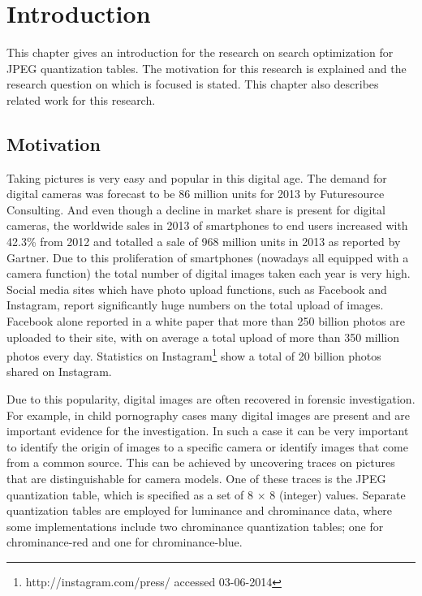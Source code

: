 
\chapter{Introduction} %

\label{ch:name} %

This chapter gives an introduction for the research on search optimization for JPEG quantization tables. The motivation for this research is explained and the research question on which is focused is stated. This chapter also describes related work for this research.

\section{Motivation}

Taking pictures is very easy and popular in this digital age. The demand for digital cameras was forecast to be 86 million units for 2013 by Futuresource Consulting\cite{futuresource}. And even though a decline in market share is present for digital cameras, the worldwide sales in 2013 of smartphones to end users increased with 42.3\% from 2012 and totalled a sale of 968 million units in 2013 as reported by Gartner\cite{gartner_smartphone}.  Due to this proliferation of smartphones (nowadays all equipped with a camera function) the total number of digital images taken each year is very high. Social media sites which have photo upload functions, such as Facebook and Instagram, report significantly huge numbers on the total upload of images. Facebook alone reported in a white paper \cite{whitefacebook} that more than 250 billion photos are uploaded to their site, with on average a total upload of more than 350 million photos every day. Statistics on Instagram\footnote{http://instagram.com/press/ accessed 03-06-2014} show a total of 20 billion photos shared on Instagram.

Due to this popularity, digital images are often recovered in forensic investigation. For example, in child pornography cases many digital images are present and are important evidence for the investigation. In such a case it can be very important to identify the origin of images to a specific camera or identify images that come from a common source. This can be achieved by uncovering traces on pictures that are distinguishable for camera models. One of these traces is the JPEG quantization table, which is specified as a set of 8 $\times$ 8 (integer) values. Separate quantization tables are employed for luminance and chrominance data, where some implementations include two chrominance quantization tables; one for chrominance-red and one for chrominance-blue. 

